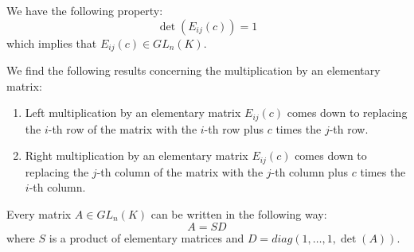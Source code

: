         \begin{property}
        	We have the following property:
			\begin{equation}\det(E_{ij}(c)) = 1\end{equation}
            which implies that $E_{ij}(c)\in GL_n(K)$.
		\end{property}
        \begin{property}
			We find the following results concerning the multiplication by an elementary matrix:
            \begin{enumerate}
				\item Left multiplication by an elementary matrix $E_{ij}(c)$ comes down to replacing the $i$-th row of the matrix with the $i$-th row plus $c$ times the $j$-th row.
                \item Right multiplication by an elementary matrix $E_{ij}(c)$ comes down to replacing the $j$-th column of the matrix with the $j$-th column plus $c$ times the $i$-th column.
			\end{enumerate}
		\end{property}
        
        \begin{theorem}
        	\label{linalgebra:theorem:elementary_matrices}
			Every matrix $A\in GL_n(K)$ can be written in the following way:
            \[A = SD\]
            where $S$ is a product of elementary matrices and $D=diag(1,\dotso,1,\det(A))$.
		\end{theorem}
        
